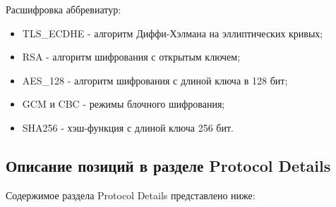 \documentclass[10pt,a4paper]{report}
\begin{document}
			Расшифровка аббревиатур:
			\begin{itemize}
				\item TLS\_ECDHE - алгоритм Диффи-Хэлмана на эллиптических кривых;
				\item RSA - алгоритм шифрования с открытым ключем;
				\item AES\_128 - алгоритм шифрования с длиной ключа в 128 бит;
				\item GCM и CBC - режимы блочного шифрования;
				\item SHA256 - хэш-функция с длиной ключа 256 бит.
			\end{itemize}
			
		\subsection{Описание позиций в разделе Protocol Details}
			Содержимое раздела Protocol Details представлено ниже:
\end{document}
